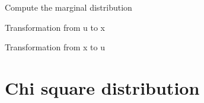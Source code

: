 \documentclass[letterpaper,10pt,english]{sphinxmanual}
\begin{document}
\begin{fulllineitems}
\begin{fulllineitems}
\end{fulllineitems}



\begin{fulllineitems}
Compute the marginal distribution

\end{fulllineitems}



\begin{fulllineitems}
Transformation from u to x

\end{fulllineitems}



\begin{fulllineitems}
Transformation from x to u

\end{fulllineitems}


\end{fulllineitems}



\section{Chi square distribution}
\label{distributions:chi-square-distribution}
\end{document}
